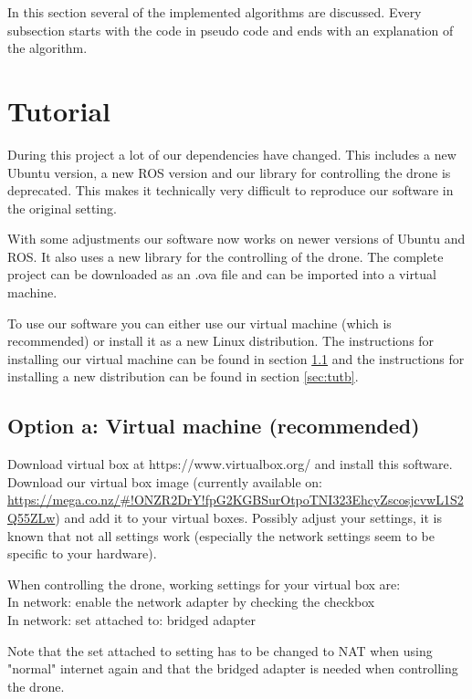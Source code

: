 \documentclass[a4paper,10pt]{article}
\begin{document}
In this section several of the implemented algorithms are discussed. Every subsection starts with the code in pseudo code and ends with an explanation of the algorithm. 

\section{Tutorial}
During this project a lot of our dependencies have changed. This includes a new Ubuntu version, a new ROS version and our library for controlling the drone is deprecated. This makes it technically very difficult to reproduce our software in the original setting. 

With some adjustments our software now works on newer versions of Ubuntu and ROS. 
It also uses a new library for the controlling of the drone. 
The complete project can be downloaded as an .ova file and can be imported into a virtual machine. 

To use our software you can either use our virtual machine (which is recommended) or install it as a new Linux distribution. The instructions for installing our virtual machine can be found in section \ref{sec:tuta} and the instructions for installing a new distribution can be found in section \ref{sec:tutb}. 

\subsection{Option a: Virtual machine (recommended)}
\label{sec:tuta}
Download virtual box at https://www.virtualbox.org/ and install this software. 
Download our virtual box image (currently available on:\\
 \url{https://mega.co.nz/#!ONZR2DrY!fpG2KGBSurOtpoTNI323EhcyZscosjcvwL1S2Q55ZLw}) and add it to your virtual boxes. 
Possibly adjust your settings, it is known that not all settings work (especially the network settings seem to be specific to your hardware). 

When controlling the drone, working settings for your virtual box are:\\
In network: enable the network adapter by checking the checkbox\\
In network: set attached to: bridged adapter

Note that the set attached to setting has to be changed to NAT when using "normal" internet again and that the bridged adapter is needed when controlling the drone. 
\end{document}
